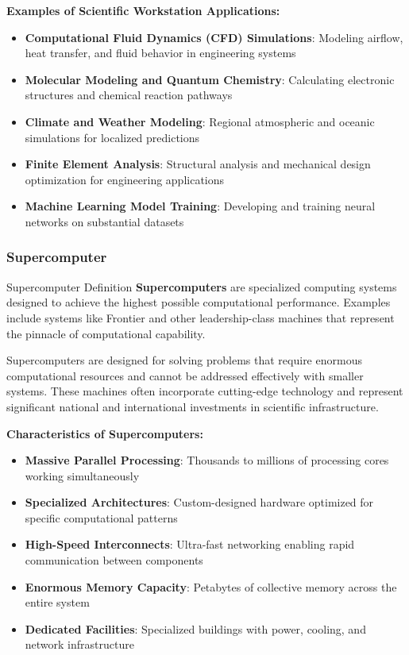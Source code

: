 \textbf{Examples of Scientific Workstation Applications:}
\begin{itemize}
    \item \textbf{Computational Fluid Dynamics (CFD) Simulations}: Modeling airflow, heat transfer, and fluid behavior in engineering systems
    \item \textbf{Molecular Modeling and Quantum Chemistry}: Calculating electronic structures and chemical reaction pathways
    \item \textbf{Climate and Weather Modeling}: Regional atmospheric and oceanic simulations for localized predictions
    \item \textbf{Finite Element Analysis}: Structural analysis and mechanical design optimization for engineering applications
    \item \textbf{Machine Learning Model Training}: Developing and training neural networks on substantial datasets
\end{itemize}

\subsubsection{Supercomputer}

\begin{conceptcard}{Supercomputer Definition}
\textbf{Supercomputers} are specialized computing systems designed to achieve the highest possible computational performance. Examples include systems like Frontier and other leadership-class machines that represent the pinnacle of computational capability.
\end{conceptcard}

Supercomputers are designed for solving problems that require enormous computational resources and cannot be addressed effectively with smaller systems. These machines often incorporate cutting-edge technology and represent significant national and international investments in scientific infrastructure.

\textbf{Characteristics of Supercomputers:}
\begin{itemize}
    \item \textbf{Massive Parallel Processing}: Thousands to millions of processing cores working simultaneously
    \item \textbf{Specialized Architectures}: Custom-designed hardware optimized for specific computational patterns
    \item \textbf{High-Speed Interconnects}: Ultra-fast networking enabling rapid communication between components
    \item \textbf{Enormous Memory Capacity}: Petabytes of collective memory across the entire system
    \item \textbf{Dedicated Facilities}: Specialized buildings with power, cooling, and network infrastructure
\end{itemize}

